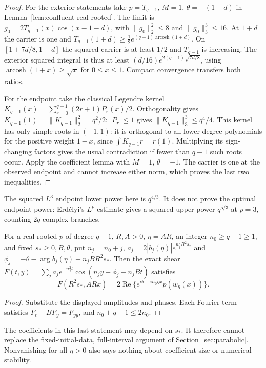 \begin{proof}
For the exterior statements take $p=T_{q-1}$, $M=1$,
$\theta=-(1+d)$ in Lemma~\ref{lem:confluent-real-rooted}.
The limit is $g_0=2T_{q-1}(x)\cos(x-1-d)$, with
$\|g_0\|_2^2\le8$ and $\|g_0\|_3^3\le16$.
At $1+d$ the carrier is one and
$T_{q-1}(1+d)\ge\tfrac12e^{(q-1)\operatorname{arcosh}(1+d)}$.
On $[1+7d/8,1+d]$ the squared carrier is at least $1/2$ and
$T_{q-1}$ is increasing. The exterior squared integral is thus at least
$(d/16)e^{2(q-1)\sqrt{7d/8}}$, using
$\operatorname{arcosh}(1+x)\ge\sqrt x$ for $0\le x\le1$.
Compact convergence transfers both ratios.

For the endpoint take the classical Legendre kernel
$K_{q-1}(x)=\sum_{r=0}^{q-1}(2r+1)P_r(x)/2$.
Orthogonality gives $K_{q-1}(1)=\|K_{q-1}\|_2^2=q^2/2$;
$|P_r|\le1$ gives $\|K_{q-1}\|_3^3\le q^4/4$.
This kernel has only simple roots in $(-1,1)$: it is orthogonal to
all lower degree polynomials for the positive weight $1-x$, since
$\int K_{q-1}r=r(1)$. Multiplying its sign-changing factors gives
the usual contradiction if fewer than $q-1$ such roots occur.
Apply the coefficient lemma with $M=1$, $\theta=-1$.
The carrier is one at the observed endpoint and cannot increase either
norm, which proves the last two inequalities.
\end{proof}

The squared $L^3$ endpoint lower power here is $q^{4/3}$.
It does not prove the optimal endpoint power: Erd\'elyi's
$L^p$ estimate \cite[Theorem 2.10, arXiv v1]{Erdelyi2017}
gives a squared upper power $q^{5/3}$ at $p=3$, counting $2q$
complex branches.

\begin{proposition}
\label{thm:integer-slice}
For a real-rooted $p$ of degree $q-1$, $R,A>0$, $\eta=AR$,
an integer $n_0\ge q-1\ge1$, and fixed $s_*\ge0,B,\theta$, put
$n_j=n_0+j$, $a_j=2|b_j(\eta)|e^{n_j^2R^2s_*}$ and
$\phi_j=-\theta-\arg b_j(\eta)-n_jBR^2s_*$.
Then the exact shear
$F(t,y)=\sum_j a_je^{-n_j^2t}\cos(n_jy-\phi_j-n_jBt)$ satisfies
\[
 F(R^2s_*,ARx)=2\operatorname{Re}
       \{e^{i\theta+in_0\eta x}p(w_\eta(x))\}.
\]
\end{proposition}

\begin{proof}
Substitute the displayed amplitudes and phases. Each Fourier term
satisfies $F_t+BF_y=F_{yy}$, and $n_0+q-1\le2n_0$.
\end{proof}

The coefficients in this last statement may depend on $s_*$.
It therefore cannot replace the fixed-initial-data, full-interval
argument of Section~\ref{sec:parabolic}. Nonvanishing for all
$\eta>0$ also says nothing about coefficient size or numerical stability.
